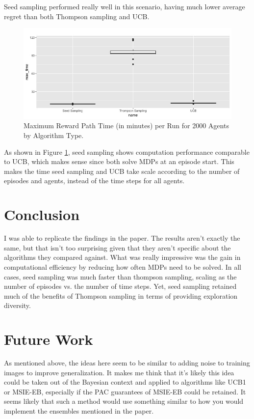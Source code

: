 \documentclass[final]{beamer}
\begin{document}
\begin{frame}[t]
\begin{multicols}{3}
Seed sampling performed really well in this scenario, having much lower average regret than both Thompson sampling and UCB.

\begin{figure}[htbp!]
  \centering
\includegraphics[scale=.75]{../project_update/mr_max_time_per_ag_by_algo.jpg}

  \caption{Maximum Reward Path Time (in minutes) per Run for 2000 Agents by Algorithm Type.}
 \label{fig:mr_max_time_per_ag_by_algo}
\end{figure}
As shown in Figure \ref{fig:mr_max_time_per_ag_by_algo}, seed sampling shows computation performance comparable to UCB, which makes sense since both solve MDPs at an episode start. This makes the time seed sampling and UCB take scale according to the number of episodes and agents, instead of the time steps for all agents.
\section{Conclusion}

I was able to replicate the findings in the paper. The results aren't exactly the same, but that isn't too surprising given that they aren't specific about the algorithms they compared against. What was really impressive was the gain in computational efficiency by reducing how often MDPs need to be solved. In all cases, seed sampling was much faster than thompson sampling, scaling as the number of episodes vs. the number of time steps. Yet, seed sampling retained much of the benefits of Thompson sampling in terms of providing exploration diversity.


\section{Future Work}
As mentioned above, the ideas here seem to be similar to adding noise to training images to improve generalization. It makes me think that it's likely this idea could be taken out of the Bayesian context and applied to algorithms like UCB1 or MSIE-EB, especially if the PAC guarantees of MSIE-EB could be retained. It seems likely that such a method would use something similar to how you would implement the ensembles mentioned in the \cite{SCALSS} paper.



\end{multicols}
\end{frame}
\end{document}
